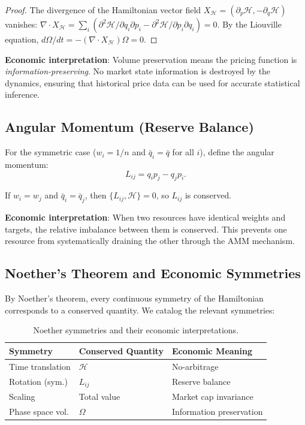 \begin{proof}
The divergence of the Hamiltonian vector field $X_\mathcal{H} = (\partial_p \mathcal{H}, -\partial_q \mathcal{H})$ vanishes:
$\nabla \cdot X_\mathcal{H} = \sum_i (\partial^2 \mathcal{H}/\partial q_i \partial p_i - \partial^2 \mathcal{H}/\partial p_i \partial q_i) = 0$.
By the Liouville equation, $d\Omega/dt = -(\nabla \cdot X_\mathcal{H})\Omega = 0$.
\end{proof}

\textbf{Economic interpretation}: Volume preservation means the pricing function is \emph{information-preserving}. No market state information is destroyed by the dynamics, ensuring that historical price data can be used for accurate statistical inference.

\subsection{Angular Momentum (Reserve Balance)}

For the symmetric case ($w_i = 1/n$ and $\bar{q}_i = \bar{q}$ for all $i$), define the angular momentum:
\begin{equation}
L_{ij} = q_i p_j - q_j p_i.
\end{equation}

\begin{proposition}
If $w_i = w_j$ and $\bar{q}_i = \bar{q}_j$, then $\{L_{ij}, \mathcal{H}\} = 0$, so $L_{ij}$ is conserved.
\end{proposition}

\textbf{Economic interpretation}: When two resources have identical weights and targets, the relative imbalance between them is conserved. This prevents one resource from systematically draining the other through the AMM mechanism.

\subsection{Noether's Theorem and Economic Symmetries}

By Noether's theorem, every continuous symmetry of the Hamiltonian corresponds to a conserved quantity. We catalog the relevant symmetries:

\begin{table}[H]
\centering
\begin{tabular}{lll}
\toprule
\textbf{Symmetry} & \textbf{Conserved Quantity} & \textbf{Economic Meaning} \\
\midrule
Time translation & $\mathcal{H}$ & No-arbitrage \\
Rotation (sym.) & $L_{ij}$ & Reserve balance \\
Scaling & Total value & Market cap invariance \\
Phase space vol. & $\Omega$ & Information preservation \\
\bottomrule
\end{tabular}
\caption{Noether symmetries and their economic interpretations.}
\label{tab:noether}
\end{table}

